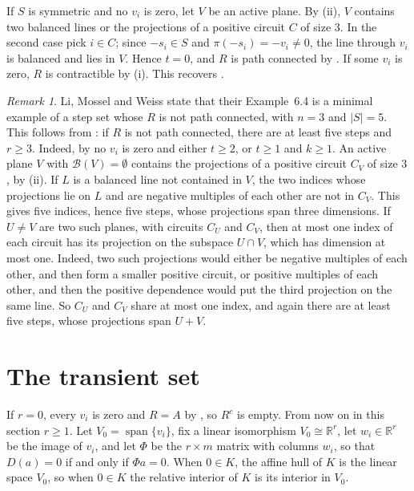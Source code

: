 \documentclass[11pt]{article}
\theoremstyle{remark}
\newtheorem{remark}[theorem]{Remark}
\DeclareMathOperator{\spn}{span}
\newcommand{\R}{\mathbb{R}}
\begin{document}
If $S$ is symmetric and no $v_i$ is zero, let $V$ be an active plane. By (ii), $V$ contains two
balanced lines or the projections of a positive circuit $C$ of size $3$. In the second case pick $i\in C$; since
$-s_i\in S$ and $\pi(-s_i)=-v_i\neq 0$, the line through $v_i$ is balanced and lies in $V$. Hence $t=0$, and $R$ is
path connected by . If some $v_i$ is zero, $R$ is contractible by (i). This recovers
\cite[Theorem~6.3]{LMW}.

\begin{remark}\label{rem:minimal}
Li, Mossel and Weiss state that their Example~6.4 is a minimal example of a step set whose $R$ is not path connected, with $n=3$ and $|S|=5$.
This follows from : if $R$ is not path connected, there are at least five steps and $r\ge 3$. Indeed, by
 no $v_i$ is zero and either $t\ge 2$, or $t\ge 1$ and $k\ge 1$. An active plane $V$ with
$\mathcal B(V)=\emptyset$ contains the projections of a positive circuit $C_V$ of size $3$, by
(ii). If $L$ is a balanced line not contained in $V$, the two indices whose projections lie on $L$ and are
negative multiples of each other are not in $C_V$. This gives five indices, hence five steps, whose projections span three
dimensions. If $U\neq V$ are two such planes, with circuits $C_U$ and $C_V$, then at most one index of each circuit has
its projection on the subspace $U\cap V$, which has dimension at most one. Indeed, two such projections would either
be negative multiples of each other, and then form a smaller positive circuit, or positive multiples of each other,
and then the positive dependence would put the third projection on the same line. So $C_U$ and $C_V$ share at most one index, and again there are at least
five steps, whose projections span $U+V$.
\end{remark}

\section{The transient set}\label{sec:trans}

If $r=0$, every $v_i$ is zero and $R=A$ by , so $R^c$ is empty. From now on in this section
$r\ge 1$. Let $V_0=\spn\{v_i\}$, fix a linear isomorphism $V_0\cong\R^r$, let $w_i\in\R^r$ be
the image of $v_i$, and let $\Phi$ be the $r\times m$ matrix with columns $w_i$, so that $D(a)=0$ if and only if $\Phi a=0$.
When $0\in K$, the affine hull of $K$ is the linear space $V_0$, so when $0\in K$ the relative interior of $K$ is its
interior in $V_0$.
\end{document}

